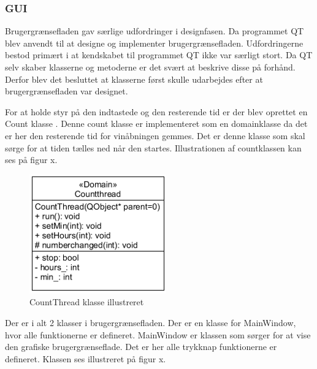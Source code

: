 \subsubsection{GUI}

Brugergrænsefladen gav særlige udfordringer i designfasen. Da programmet QT blev anvendt til at designe og implementer brugergrænsefladen. Udfordringerne bestod primært i at kendskabet til programmet QT ikke var særligt stort. Da QT selv skaber klasserne og metoderne er det svært at beskrive disse på forhånd. Derfor blev det besluttet at klasserne først skulle udarbejdes efter at brugergrænsefladen var designet. 

For at holde styr på den indtastede og den resterende tid er der blev oprettet en Count klasse . Denne count klasse er implementeret som en domainklasse da det er her den resterende tid for vinåbningen gemmes. Det er denne klasse som skal sørge for at tiden tælles ned når den startes. Illustrationen af countklassen kan ses på figur x.

\begin{figure}[H]
	\centerline{\includegraphics[scale=1]{tex/Design/GUI/Fotos/CountThread}}
	\caption{CountThread klasse illustreret}
\end{figure}

Der er i alt 2 klasser i brugergrænsefladen. Der er en klasse for MainWindow, hvor alle funktionerne er defineret. MainWindow er klassen som sørger for at vise den grafiske brugergrænseflade. Det er her alle trykknap funktionerne er defineret. Klassen ses illustreret på figur x. 

